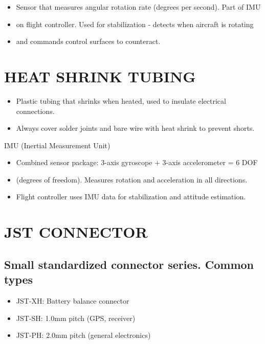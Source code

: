 \documentclass[11pt,letterpaper]{article}
\begin{document}
\begin{itemize}
  \item Sensor that measures angular rotation rate (degrees per second). Part of IMU
  \item on flight controller. Used for stabilization - detects when aircraft is rotating
  \item and commands control surfaces to counteract.
\end{itemize}

\section{HEAT SHRINK TUBING}

\begin{itemize}
  \item Plastic tubing that shrinks when heated, used to insulate electrical connections.
  \item Always cover solder joints and bare wire with heat shrink to prevent shorts.
\end{itemize}

IMU (Inertial Measurement Unit)\par

\begin{itemize}
  \item Combined sensor package: 3-axis gyroscope + 3-axis accelerometer = 6 DOF
  \item (degrees of freedom). Measures rotation and acceleration in all directions.
  \item Flight controller uses IMU data for stabilization and attitude estimation.
\end{itemize}

\section{JST CONNECTOR}

\subsection{Small standardized connector series. Common types}

\begin{itemize}
  \item JST-XH: Battery balance connector
  \item JST-SH: 1.0mm pitch (GPS, receiver)
  \item JST-PH: 2.0mm pitch (general electronics)
\end{itemize}
\end{document}

